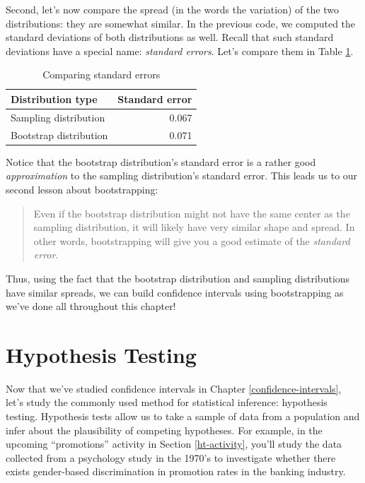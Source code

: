 \documentclass[
]{book}
\begin{document}
Second, let's now compare the spread (in the words the variation) of the two distributions: they are somewhat similar. In the previous code, we computed the standard deviations of both distributions as well. Recall that such standard deviations have a special name: \emph{standard errors}. Let's compare them in Table \ref{tab:comparing-se}.

\begin{table}[!h]

\caption{\label{tab:comparing-se}Comparing standard errors}
\centering
\fontsize{10}{12}\selectfont
\begin{tabular}[t]{lr}
\toprule
Distribution type & Standard error\\
\midrule
Sampling distribution & 0.067\\
Bootstrap distribution & 0.071\\
\bottomrule
\end{tabular}
\end{table}

Notice that the bootstrap distribution's standard error is a rather good \emph{approximation} to the sampling distribution's standard error. This leads us to our second lesson about bootstrapping:

\begin{quote}
Even if the bootstrap distribution might not have the same center as the sampling distribution, it will likely have very similar shape and spread. In other words, bootstrapping will give you a good estimate of the \emph{standard error}.
\end{quote}

Thus, using the fact that the bootstrap distribution and sampling distributions have similar spreads, we can build confidence intervals using bootstrapping as we've done all throughout this chapter!

\hypertarget{hypothesis-testing}{%
\chapter{Hypothesis Testing}\label{hypothesis-testing}}

Now that we've studied confidence intervals in Chapter \ref{confidence-intervals}, let's study the commonly used method for statistical inference: hypothesis testing. Hypothesis tests allow us to take a sample of data from a population and infer about the plausibility of competing hypotheses. For example, in the upcoming ``promotions'' activity in Section \ref{ht-activity}, you'll study the data collected from a psychology study in the 1970's to investigate whether there exists gender-based discrimination in promotion rates in the banking industry.
\end{document}
